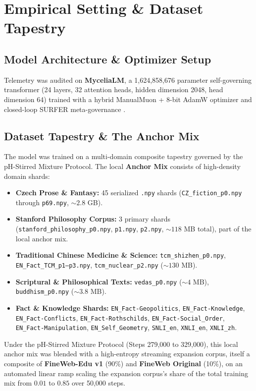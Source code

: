 \documentclass[11pt,twocolumn]{article}
\begin{document}
\section{Empirical Setting \& Dataset Tapestry}
\subsection{Model Architecture \& Optimizer Setup}
Telemetry was audited on \textbf{MyceliaLM}, a 1,624,858,676 parameter self-governing transformer (24 layers, 32 attention heads, hidden dimension 2048, head dimension 64) trained with a hybrid ManualMuon + 8-bit AdamW optimizer and closed-loop SURFER meta-governance \cite{massif}.

\subsection{Dataset Tapestry \& The Anchor Mix}
The model was trained on a multi-domain composite tapestry governed by the pH-Stirred Mixture Protocol. The local \textbf{Anchor Mix} consists of high-density domain shards:
\begin{itemize}
\item \textbf{Czech Prose \& Fantasy:} 45 serialized \texttt{.npy} shards (\texttt{CZ\_fiction\_p0.npy} through \texttt{p69.npy}, $\sim 2.8$ GB).
\item \textbf{Stanford Philosophy Corpus:} 3 primary shards (\texttt{stanford\_philosophy\_p0.npy}, \texttt{p1.npy}, \texttt{p2.npy}, $\sim 118$ MB total), part of the local anchor mix.
\item \textbf{Traditional Chinese Medicine \& Science:} \texttt{tcm\_shizhen\_p0.npy}, \texttt{EN\_Fact\_TCM\_p1--p3.npy}, \texttt{tcm\_nuclear\_p2.npy} ($\sim 130$ MB).
\item \textbf{Scriptural \& Philosophical Texts:} \texttt{vedas\_p0.npy} ($\sim 4$ MB), \texttt{buddhism\_p0.npy} ($\sim 3.8$ MB).
\item \textbf{Fact \& Knowledge Shards:} \texttt{EN\_Fact-Geopolitics}, \texttt{EN\_Fact-Knowledge}, \texttt{EN\_Fact-Conflicts}, \texttt{EN\_Fact-Rothschilds}, \texttt{EN\_Fact-Social\_Order}, \texttt{EN\_Fact-Manipulation}, \texttt{EN\_Self\_Geometry}, \texttt{SNLI\_en}, \texttt{XNLI\_en}, \texttt{XNLI\_zh}.
\end{itemize}

Under the pH-Stirred Mixture Protocol (Steps 279,000 to 329,000), this local anchor mix was blended with a high-entropy streaming expansion corpus, itself a composite of \textbf{FineWeb-Edu v1} (90\%) and \textbf{FineWeb Original} (10\%), on an automated linear ramp scaling the expansion corpus's share of the total training mix from $0.01$ to $0.85$ over 50,000 steps.
\end{document}
